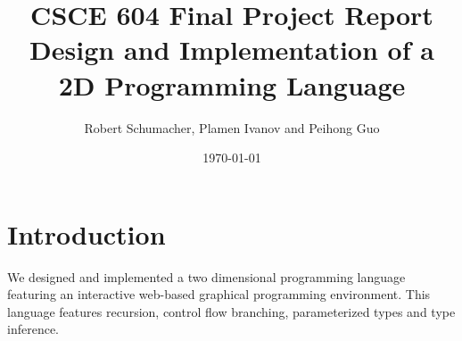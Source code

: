 \documentclass[12pt,UTF8,a4]{article}
\title{CSCE 604 Final Project Report \\ Design and Implementation of a 2D Programming Language}
\author{Robert Schumacher, Plamen Ivanov and Peihong Guo}
\date{\today}
\newcommand{\code}[1]{\texttt{#1}}
\newcommand{\type}[1]{\texttt{#1}}
\begin{document}
\maketitle
\singlespacing

\tableofcontents

\section{Introduction}
We designed and implemented a two dimensional programming language
featuring an interactive web-based graphical programming environment.
This language features recursion, control flow branching,
parameterized types and type inference.



\end{document}
